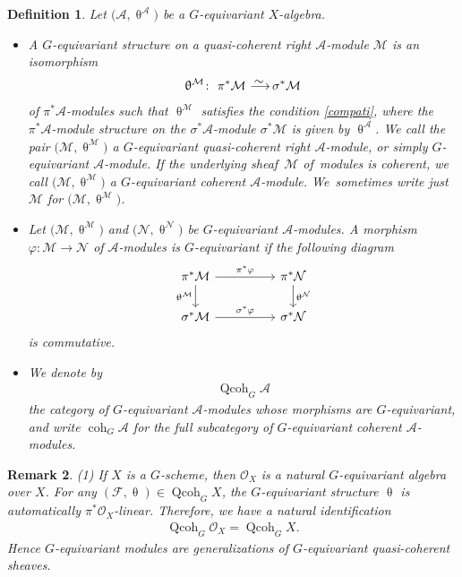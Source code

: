 \documentclass[11pt]{article}
\numberwithin{equation}{section}
\newtheorem{dfn}{Definition}[section]
\newtheorem{rem}[dfn]{Remark}
\numberwithin{equation}{section}
\newcommand{\coh}{\operatorname{coh}}
\newcommand{\Qcoh}{\operatorname{Qcoh}}
\newcommand{\cA}{\mathcal{A}}
\newcommand{\cF}{\mathcal{F}}
\newcommand{\cM}{\mathcal{M}}
\newcommand{\cN}{\mathcal{N}}
\newcommand{\cO}{\mathcal{O}}
\newcommand{\simto}{\,\,\,\,\raisebox{4pt}{$\sim$}{\kern -1.1em \longrightarrow}\,}
\begin{document}
\begin{dfn}\label{equiv sheaf}
Let $\big(\cA,\uptheta^{\cA}\big)$ be a $G$-equivariant $X$-algebra.
\begin{itemize}\itemsep=0pt
\item[1.] A {\it $G$-equivariant structure} on a quasi-coherent right $\cA$-module $\cM$ is an isomorphism
\begin{gather*}
\uptheta^{\cM}\colon\ \pi^*\cM\simto \sigma^*\cM
\end{gather*}
of $\pi^*\cA$-modules such that $\uptheta^{\cM}$ satisfies the condition \eqref{compati}, where the $\pi^*\cA$-module structure on the $\sigma^*\cA$-module $\sigma^*\cM$ is given by $\uptheta^{\cA}$.
We call the pair $\big(\cM,\uptheta^{\cM}\big)$ a {\it $G$-equivariant quasi-coherent right $\cA$-module}, or simply {\it $G$-equivariant $\cA$-module}. If the underlying sheaf~$\cM$ of~modu\-les is coherent, we call $\big(\cM,\uptheta^{\cM}\big)$ a {\it $G$-equivariant coherent $\cA$-module}. We~sometimes write just $\cM$ for $\big(\cM,\uptheta^{\cM}\big)$.


\item[2.] Let $\big(\cM,\uptheta^{\cM}\big)$ and $\big(\cN,\uptheta^{\cN}\big)$ be $G$-equivariant $\cA$-modules. A morphism $\varphi\colon \cM\to \cN$ of $\cA$-modules is {\it $G$-equivariant} if the following diagram
\[
\begin{tikzcd}
\pi^*\cM\arrow[rr,"\pi^*\varphi"]\arrow[d,"\uptheta^{\cM}"']&&\pi^*\cN\arrow[d," \uptheta^{\cN}"]\\
\sigma^*\cM\arrow[rr, "\sigma^*\varphi"]&&\sigma^*\cN
\end{tikzcd}
\]
is commutative.

\item[3.] We denote by
\begin{gather*}\Qcoh_G\cA\end{gather*} the category of $G$-equivariant $\cA$-modules whose morphisms are $G$-equivariant, and write $\coh_G\cA$ for the full subcategory of $G$-equivariant coherent $\cA$-modules.
\end{itemize}
\end{dfn}

\begin{rem}
(1) If $X$ is a $G$-scheme, then $\cO_X$ is a natural $G$-equivariant algebra over $X$. For any $(\cF,\uptheta)\in \Qcoh_GX$, the $G$-equivariant structure $\uptheta$ is automatically $\pi^*\cO_X$-linear. Therefore, we have a natural identification
\begin{gather*}
\Qcoh_G\cO_X=\Qcoh_GX.
\end{gather*}
Hence $G$-equivariant modules are generalizations of $G$-equivariant quasi-coherent sheaves.
\end{rem}
\end{document}

